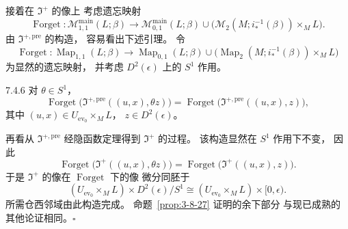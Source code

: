 接着在 $\mathfrak I^+$ 的像上
考虑遗忘映射
\[
\operatorname{Forget}\colon
\mathcal M^{\mathrm{main}}_{1,1}(L;\beta)
\longrightarrow
\mathcal M^{\mathrm{main}}_{0,1}(L;\beta)
\cup
\bigl(\mathcal M_2(M;i_*^{-1}(\beta))
\times_M L\bigr).
\]
由 $\mathfrak I^{+,\mathrm{pre}}$ 的构造，
容易看出下述引理。
令
\[
\operatorname{Forget}\colon
\operatorname{Map}_{1,1}(L;\beta)
\longrightarrow
\operatorname{Map}_{0,1}(L;\beta)
\cup
\bigl(\operatorname{Map}_2(M;i_*^{-1}(\beta))
\times_M L\bigr)
\]
为显然的遗忘映射，
并考虑 $D^2(\epsilon)$ 上的
$S^1$ 作用。
\begin{lemma}{7.4.6}\label{lem:7-4-6}
对 $\theta\in S^1$，
\[
\operatorname{Forget}
\bigl(\mathfrak I^{+,\mathrm{pre}}((u,x),\theta z)\bigr)
=
\operatorname{Forget}
\bigl(\mathfrak I^{+,\mathrm{pre}}((u,x),z)\bigr),
\]
其中
$(u,x)\in U_{\operatorname{ev}_0}\times_M L$，
$z\in D^2(\epsilon)$。
\end{lemma}

再看从 $\mathfrak I^{+,\mathrm{pre}}$
经隐函数定理得到 $\mathfrak I^+$ 的过程。
该构造显然在 $S^1$ 作用下不变，
因此
\[
\operatorname{Forget}
\bigl(\mathfrak I^+((u,x),\theta z)\bigr)
=
\operatorname{Forget}
\bigl(\mathfrak I^+((u,x),z)\bigr).
\]
于是
$\mathfrak I^+$ 的像在
$\operatorname{Forget}$ 下的像
微分同胚于
\[
(U_{\operatorname{ev}_0}\times_M L)
\times D^2(\epsilon)/S^1
\cong
(U_{\operatorname{ev}_0}\times_M L)
\times[0,\epsilon).
\]
所需仓西邻域由此构造完成。
命题~\ref{prop:3-8-27} 证明的余下部分
与现已成熟的其他论证相同。\hfill$\square$
